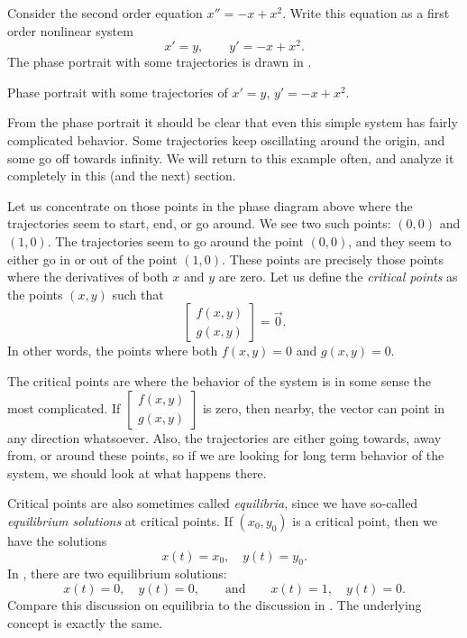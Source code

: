 \begin{example} \label{example:nlin-1b-example}
Consider the second order equation $x''=-x+x^2$.
Write this equation as a first order nonlinear system
\begin{equation*}
x' = y , \qquad y' = -x+x^2 .
\end{equation*}
The phase portrait with some trajectories is drawn in
.
\begin{myfig}
\capstart
{}
\caption{Phase portrait with some trajectories of
$x' = y$, $y' = -x+x^2$. \label{fig:nlin-1b}}
\end{myfig}

From the phase portrait it should be clear that even this simple system has
fairly complicated behavior.  Some trajectories keep oscillating around the
origin, and some go off towards infinity.  We will return to this example
often, and analyze it completely in this (and the next) section.
\end{example}

Let us concentrate on those points in the phase diagram
above where the trajectories
seem to start, end, or go around.  We see two such points:
$(0,0)$ and $(1,0)$.  The trajectories seem to go around the point $(0,0)$,
and they seem to either go in or out of the point $(1,0)$.
%
These points are precisely those points where the derivatives of both $x$
and $y$ are zero.  Let us define the \emph{critical points}
as the points $(x,y)$ such that
\begin{equation*} 
\begin{bmatrix} f(x,y) \\ g(x,y) \end{bmatrix} = \vec{0} .
\end{equation*}
In other words, the points where both $f(x,y)=0$ and $g(x,y)=0$.

The critical points are where the behavior of the system is
in some sense the most complicated.  If
$\left[ \begin{smallmatrix} f(x,y) \\ g(x,y) \end{smallmatrix} \right]$
is zero, then nearby, the vector can point in any direction whatsoever.
Also, the trajectories are either going towards, away from, or around these
points, so if we are looking for long term behavior of the system, we
should look at what happens there.

Critical points are also sometimes called
\emph{equilibria}, since we have so-called
\emph{equilibrium solutions} at critical points.
If $(x_0,y_0)$ is a critical point, then we have the solutions
\begin{equation*}
x(t) = x_0, \quad y(t) = y_0 .
\end{equation*}
In , there are two equilibrium
solutions:
\begin{equation*}
x(t) = 0, \quad y(t) = 0,
\qquad \text{and} \qquad
x(t) = 1, \quad y(t) = 0.
\end{equation*}
Compare this discussion on equilibria to the discussion in
.  The underlying concept is
exactly the same.

